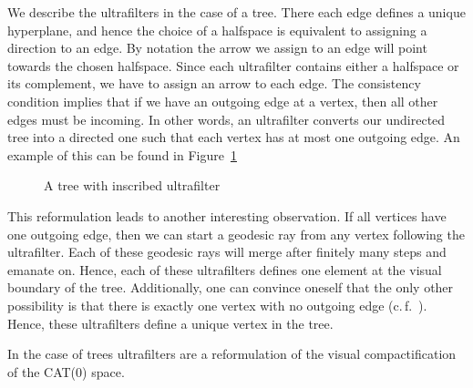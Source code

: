 \begin{bsp}[Trees]
  We describe the ultrafilters in the case of a tree. There each edge defines a unique hyperplane, and hence the choice of a halfspace is equivalent to assigning a direction to an edge. By notation the arrow we assign to an edge will point towards the chosen halfspace. Since each ultrafilter contains either a halfspace or its complement, we have to assign an arrow to each edge. The consistency condition implies that if we have an outgoing edge at a vertex, then all other edges must be incoming. In other words, an ultrafilter converts our undirected tree into a directed one such that each vertex has at most one outgoing edge. An example of this can be found in Figure~\ref{fig:ultrafilter}
  \begin{figure}[htbp]
    \centering
    
    \caption{A tree with inscribed ultrafilter}
    \label{fig:ultrafilter}
  \end{figure}

  This reformulation leads to another interesting observation. If all vertices have one outgoing edge, then we can start a geodesic ray from any vertex following the ultrafilter. Each of these geodesic rays will merge after finitely many steps and emanate on. Hence, each of these ultrafilters defines one element at the visual boundary of the tree. Additionally, one can convince oneself that the only other possibility is that there is exactly one vertex with no outgoing edge (c.\,f.~\cite[14]{sageev-lecture-notes}). Hence, these ultrafilters define a unique vertex in the tree.

  In the case of trees ultrafilters are a reformulation of the visual compactification of the CAT(0) space. 
\end{bsp}



